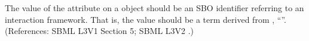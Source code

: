The value of the attribute  on a \Reaction object should be
an SBO identifier referring to an interaction framework.  That is, the
value should be a term derived from \sbointeractionID, ``''.
(References: SBML L3V1 Section 5; SBML L3V2 .)
